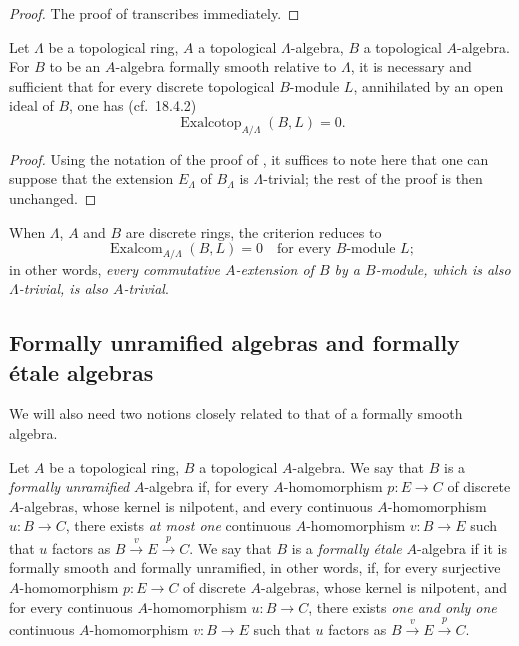 \begin{proof}
The proof of  transcribes immediately.
\end{proof}

\begin{proposition}[19.9.8]
\label{0.19.9.8}
Let $\Lambda$ be a topological ring, $A$ a topological $\Lambda$-algebra, $B$ a topological $A$-algebra.
For $B$ to be an $A$-algebra formally smooth relative to $\Lambda$, it is necessary and sufficient that for every discrete topological $B$-module $L$, annihilated by an open ideal of $B$, one has (cf.\ 18.4.2)
\[
  \operatorname{Exalcotop}_{A/\Lambda}(B,L) = 0.
\]
\end{proposition}

\begin{proof}
Using the notation of the proof of , it suffices to note here that one can suppose that the extension $E_\Lambda$ of $B_\Lambda$ is $\Lambda$-trivial; the rest of the proof is then unchanged.
\end{proof}

When $\Lambda$, $A$ and $B$ are discrete rings, the criterion  reduces to
\begin{equation}
\tag{19.9.8.1}
  \label{0.19.9.8.1}
  \operatorname{Exalcom}_{A/\Lambda}(B,L) = 0 \quad\text{for every $B$-module $L$};
\end{equation}
in other words, \emph{every commutative $A$-extension of $B$ by a $B$-module, which is also $\Lambda$-trivial, is also $A$-trivial}.

\subsection{Formally unramified algebras and formally \'{e}tale algebras}
\label{subsection:0.19.10}
\label{0.19.10}

\begin{env}[19.10.1]
\label{0.19.10.1}
We will also need two notions closely related to that of a formally smooth algebra.
\end{env}

\begin{definition}[19.10.2]
\label{0.19.10.2}
Let $A$ be a topological ring, $B$ a topological $A$-algebra.
We say that $B$ is a \emph{formally unramified} $A$-algebra if, for every $A$-homomorphism $p:E\to C$ of discrete $A$-algebras, whose kernel is nilpotent, and every continuous $A$-homomorphism $u:B\to C$, there exists \emph{at most one} continuous $A$-homomorphism $v:B\to E$ such that $u$ factors as $B\xrightarrow{v}E\xrightarrow{p}C$.
We say that $B$ is a \emph{formally \'{e}tale} $A$-algebra if it is formally smooth and formally unramified, in other words, if, for every surjective $A$-homomorphism $p:E\to C$ of discrete $A$-algebras, whose kernel is nilpotent, and for every continuous $A$-homomorphism $u:B\to C$, there exists \emph{one and only one} continuous $A$-homomorphism $v:B\to E$ such that $u$ factors as $B\xrightarrow{v}E\xrightarrow{p}C$.
\end{definition}

